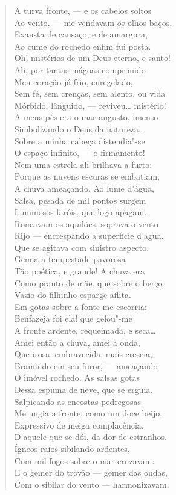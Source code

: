 \begin{verse}
A turva fronte, --- e os cabelos soltos\\
Ao vento, --- me vendavam os olhos baços.\\
Exausta de cansaço, e de amargura,\\
Ao cume do rochedo enfim fui posta.\\
Oh! mistérios de um Deus eterno, e santo!\\
Ali, por tantas mágoas comprimido\\
Meu coração já frio, enregelado,\\
Sem fé, sem crenças, sem alento, ou vida\\
Mórbido, lânguido, --- reviveu\ldots{} mistério!\\
A meus pés era o mar augusto, imenso\\
Simbolizando o Deus da natureza\ldots{}\\
Sobre a minha cabeça distendia"-se\\
O espaço infinito, --- o firmamento!\\
Nem uma estrela ali brilhava a furto:\\
Porque as nuvens escuras se embatiam,\\
A chuva ameaçando. Ao lume d'água,\\
Salsa, pesada de mil pontos surgem\\
Luminosos faróis, que logo apagam.\\
Roneavam os aquilões, soprava o vento\\
Rijo --- encrespando a superfície d'agua.\\
Que se agitava com sinistro aspecto.\\
Gemia a tempestade pavorosa\\
Tão poética, e grande! A chuva era\\
Como pranto de mãe, que sobre o berço\\
Vazio do filhinho esparge aflita.\\
Em gotas sobre a fonte me escorria:\\
Benfazeja foi ela! que gelou"-me\\
A fronte ardente, requeimada, e seca\ldots{}\\
Amei então a chuva, amei a onda,\\
Que irosa, embravecida, mais crescia,\\
Bramindo em seu furor, --- ameaçando\\
O imóvel rochedo. As salsas gotas\\
Dessa espuma de neve, que se erguia.\\
Salpicando as encostas pedregosas\\
Me ungia a fronte, como um doce beijo,\\
Expressivo de meiga complacência.\\
D'aquele que se dói, da dor de estranhos.\\
Ígneos raios sibilando ardentes,\\
Com mil fogos sobre o mar cruzavam:\\
E o gemer do trovão --- gemer das ondas,\\
Com o sibilar do vento --- harmonizavam.


\end{verse}
